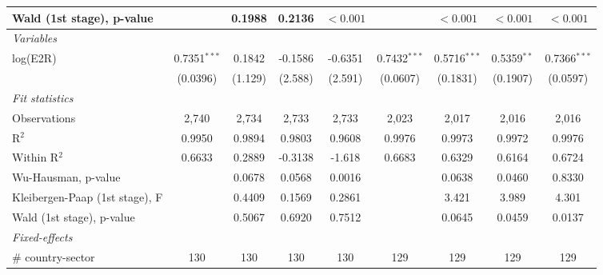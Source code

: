 \documentclass[a4paper]{article}
\begin{document}
\begin{table}[h!]
{\begin{tabular}{lcccccccc}
      Wald (1st stage), p-value &                              & 0.1988                & 0.2136                 & $<0.001$               &                    & $<0.001$               & $<0.001$               & $<0.001$\\ 
      \midrule
       \emph{Variables}\\
      log(E2R)                            & 0.7351$^{***}$     & 0.1842                & -0.1586                & -0.6351               & 0.7432$^{***}$     & 0.5716$^{***}$        & 0.5359$^{**}$          & 0.7366$^{***}$\\   
                                          & (0.0396)           & (1.129)               & (2.588)                & (2.591)               & (0.0607)           & (0.1831)              & (0.1907)               & (0.0597)\\   
      \emph{Fit statistics}\\
      Observations                        & 2,740              & 2,734                 & 2,733                  & 2,733                 & 2,023              & 2,017                 & 2,016                  & 2,016\\  
      R$^2$                               & 0.9950             & 0.9894                & 0.9803                 & 0.9608                & 0.9976             & 0.9973                & 0.9972                 & 0.9976\\  
      Within R$^2$                        & 0.6633             & 0.2889                & -0.3138                & -1.618                & 0.6683             & 0.6329                & 0.6164                 & 0.6724\\  
      Wu-Hausman, p-value                 &                    & 0.0678                & 0.0568                 & 0.0016                &                    & 0.0638                & 0.0460                 & 0.8330\\  
      Kleibergen-Paap (1st stage), F      &                    & 0.4409                & 0.1569                 & 0.2861                &                    & 3.421                 & 3.989                  & 4.301\\  
      Wald (1st stage), p-value           &                    & 0.5067                & 0.6920                 & 0.7512                &                    & 0.0645                & 0.0459                 & 0.0137\\  
      \midrule
      \emph{Fixed-effects}\\
      \# country-sector       & 130            & 130                   & 130                   & 130                   & 129      & 129                   & 129                   & 129\\  

\end{tabular}}
\end{table}
\end{document}
